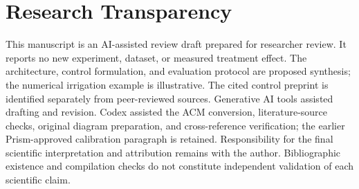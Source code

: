 \documentclass[acmsmall,screen,nonacm]{acmart}
\begin{document}
\section{Research Transparency}

\label{sec:transparency}

This manuscript is an AI-assisted review draft prepared for researcher review. It reports no new experiment, dataset, or measured treatment effect. The architecture, control formulation, and evaluation protocol are proposed synthesis; the numerical irrigation example is illustrative. The cited control preprint is identified separately from peer-reviewed sources. Generative AI tools assisted drafting and revision. Codex assisted the ACM conversion, literature-source checks, original diagram preparation, and cross-reference verification; the earlier Prism-approved calibration paragraph is retained. Responsibility for the final scientific interpretation and attribution remains with the author. Bibliographic existence and compilation checks do not constitute independent validation of each scientific claim.




\end{document}
